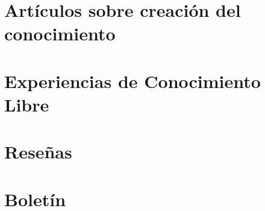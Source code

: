\documentclass[12pt,letterpaper]{book}
\begin{document}
\hojaportada
\hojalicencia
\tablacontenido

\frontmatter
\hojapresentacion
\hojaeditorial

\mainmatter
\fancychapterstyle
{}

\chapter{Artículos sobre creación del conocimiento}\BgThispage


\chapter{Experiencias de Conocimiento Libre}\BgThispage


\chapter{Reseñas}\BgThispage


\chapter{Boletín}\BgThispage


\hojacontraportada
\end{document}
